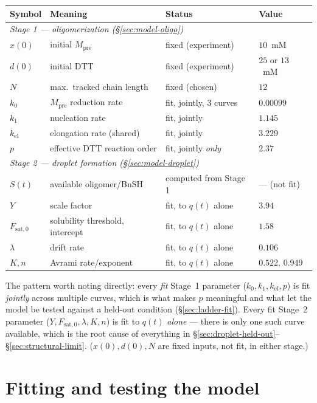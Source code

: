 \documentclass[11pt]{article}
\begin{document}
\begin{center}
\begin{tabular}{lp{5.3cm}ll}
\toprule
Symbol & Meaning & Status & Value\\
\midrule
\multicolumn{4}{l}{\emph{Stage 1 --- oligomerization (\S\ref{sec:model-oligo})}}\\
$x(0)$ & initial $M_{\mathrm{pre}}$ & fixed (experiment) & $10$~mM\\
$d(0)$ & initial DTT & fixed (experiment) & $25$ or $13$~mM\\
$N$ & max.\ tracked chain length & fixed (chosen) & $12$\\
$k_0$ & $M_{\mathrm{pre}}$ reduction rate & fit, jointly, 3 curves & $0.00099$\\
$k_1$ & nucleation rate & fit, jointly & $1.145$\\
$k_{\mathrm{el}}$ & elongation rate (shared) & fit, jointly & $3.229$\\
$p$ & effective DTT reaction order & fit, jointly \emph{only} & $2.37$\\
\multicolumn{4}{l}{\emph{Stage 2 --- droplet formation (\S\ref{sec:model-droplet})}}\\
$S(t)$ & available oligomer/BnSH & computed from Stage 1 & --- (not fit)\\
$Y$ & scale factor & fit, to $q(t)$ alone & $3.94$\\
$F_{\mathrm{sat},0}$ & solubility threshold, intercept & fit, to $q(t)$ alone & $1.58$\\
$\lambda$ & drift rate & fit, to $q(t)$ alone & $0.106$\\
$K,n$ & Avrami rate/exponent & fit, to $q(t)$ alone & $0.522,\,0.949$\\
\bottomrule
\end{tabular}
\end{center}
The pattern worth noting directly: every \emph{fit} Stage~1 parameter
($k_0,k_1,k_{\mathrm{el}},p$) is fit \emph{jointly} across multiple curves, which is what
makes $p$ meaningful and what let the model be tested against a held-out condition
(\S\ref{sec:ladder-fit}). Every fit Stage~2 parameter ($Y,F_{\mathrm{sat},0},\lambda,K,n$) is
fit to $q(t)$ \emph{alone} --- there is only one such curve available, which is the root
cause of everything in \S\ref{sec:droplet-held-out}--\S\ref{sec:structural-limit}. ($x(0),
d(0), N$ are fixed inputs, not fit, in either stage.)

\section{Fitting and testing the model}
\label{sec:fits}
\end{document}
